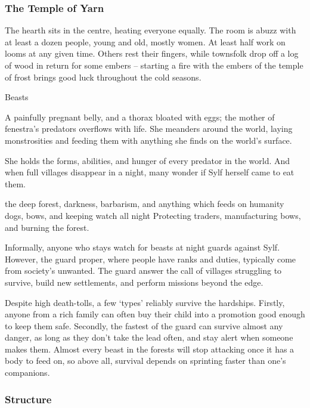 \begin{multicols}{2}
\subsubsection{The Temple of Yarn}

The hearth sits in the centre, heating everyone equally.
The room is abuzz with at least a dozen people, young and old, mostly women.
At least half work on looms at any given time.
Others rest their fingers, while townsfolk drop off a log of wood in return for some embers -- starting a fire with the embers of the temple of frost brings good luck throughout the cold seasons.


  {\textxswdown}%
  {Beasts}%
  {%
    A painfully pregnant belly, and a thorax bloated with eggs; the mother of \gls{fenestra}'s predators overflows with life.
    She meanders around the world, laying monstrosities and feeding them with anything she finds on the world's surface.

    She holds the forms, abilities, and hunger of every predator in the world.
    And when full villages disappear in a night, many wonder if Sylf herself came to eat them.
  }%
  {the deep forest, darkness, barbarism, and anything which feeds on humanity}%
  {dogs, bows, and keeping watch all night}%
  {}%
  {
    Protecting traders, manufacturing bows, and burning the forest.
  }%

Informally, anyone who stays watch for beasts at night guards against Sylf.
However, the \gls{guard} proper, where people have ranks and duties, typically come from society's unwanted.
The \gls{guard} answer the call of villages struggling to survive, build new settlements, and perform missions beyond the \gls{edge}.

Despite high death-tolls, a few `types' reliably survive the hardships.
Firstly, anyone from a rich family can often buy their child into a promotion good enough to keep them safe.
Secondly, the fastest of the \gls{guard} can survive almost any danger, as long as they don't take the lead often, and stay alert when someone makes them.
Almost every beast in the forests will stop attacking once it has a body to feed on, so above all, survival depends on sprinting faster than one's companions.

\subsubsection{Structure}


\end{multicols}
